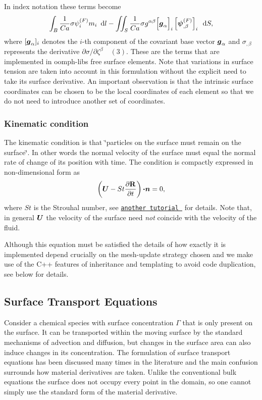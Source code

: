 In index notation these terms become \[ \int_{B} \frac{1}{Ca} \sigma \psi_{i}^{(F)} m_{i}\,\mbox{ d}l - \int\!\!\!\int_{S} \frac{1}{Ca} \sigma g^{\alpha\beta} \Big[\mbox{\boldmath$g$}_{\alpha}\Big]_{i} \left[\mbox{\boldmath$\psi$}^{(F)}_{,\beta}\right]_{i} \, \mbox{ d}S, \] where $ [\mbox{\boldmath$g$}_{\alpha}]_{i} $ denotes the $ i\!$-\/th component of the covariant base vector $ \mbox{\boldmath$g$}_{\alpha} $ and $ \sigma_{,\beta}$ represents the derivative $ \partial \sigma / \partial \zeta^{\beta} \quad (3) $. These are the terms that are implemented in {\ttfamily oomph-\/lib\textquotesingle{}s} free surface elements. Note that variations in surface tension are taken into account in this formulation without the explicit need to take its surface derivative. An important observation is that the intrinsic surface coordinates can be chosen to be the local coordinates of each element so that we do not need to introduce another set of coordinates.\hypertarget{index_kin_con}{}\subsubsection{Kinematic condition}\label{index_kin_con}
The kinematic condition is that \char`\"{}particles on the surface must
 remain on the surface\char`\"{}. In other words the normal velocity of the surface must equal the normal rate of change of its position with time. The condition is compactly expressed in non-\/dimensional form as \[ \left(\mbox{\boldmath$U$} - St \frac{\partial \mathbf{R}}{\partial t}\right) \mbox{\boldmath$\cdot n$} = 0, \] where $ St$ is the Strouhal number, see \href{../../single_layer_free_surface/html/index.html}{\tt another tutorial } for details. Note that, in general $ \mbox{\boldmath$U$}$ the velocity of the surface need {\itshape  not } coincide with the velocity of the fluid.

Although this equation must be satisfied the details of how exactly it is implemented depend crucially on the mesh-\/update strategy chosen and we make use of the C++ features of inheritance and templating to avoid code duplication, see below for details.



\hypertarget{index_surface_transport}{}\subsection{Surface Transport Equations}\label{index_surface_transport}
Consider a chemical species with surface concentration $ \Gamma$ that is only present on the surface. It can be transported within the moving surface by the standard mechanisms of advection and diffusion, but changes in the surface area can also induce changes in its concentration. The formulation of surface transport equations has been discussed many times in the literature and the main confusion surrounds how material derivatives are taken. Unlike the conventional bulk equations the surface does not occupy every point in the domain, so one cannot simply use the standard form of the material derivative.

